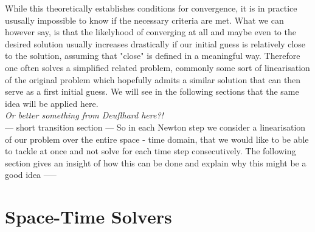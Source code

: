 \documentclass[fleqn, a4paper, 11pt, bibliography=totoc]{report}
\begin{document}
While this theoretically establishes conditions for convergence, it is in practice ususally impossible to know if the necessary criteria are met. What we can however say, is that the likelyhood of converging at all and maybe even to the desired solution usually increases drastically if our initial guess is relatively close to the solution, assuming that "close" is defined in a meaningful way. Therefore one often solves a simplified related problem, commonly some sort of linearisation of the original problem which hopefully admits a similar solution that can then serve as a first initial guess. We will see in the following sections that the same idea will be applied here. 
\bigskip
\\
\textit{Or better something from Deuflhard here?!}
\bigskip
\\
--- short transition section --- So in each Newton step we consider a linearisation of our problem over the entire space - time domain, that we would like to be able to tackle at once and not solve for each time step consecutively. The following section gives an insight of how this can be done and explain why this might be a good idea -----

\section{Space-Time Solvers}
\end{document}
